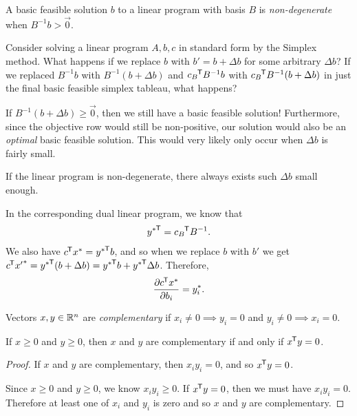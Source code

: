 \begin{defn}
    A basic feasible solution $b$ to a linear program with basis $B$ is \emph{non-degenerate} when $B^{-1}b > \vec{0}$.
\end{defn}

Consider solving a linear program $A, b, c$ in standard form by the Simplex method. What happens if we replace $b$ with $b' = b + \Delta b$ for some arbitrary $\Delta b$? If we replaced $B^{-1}b$ with $B^{-1}(b + \Delta b)$ and ${c_B}^{\mkern-1.5mu\mathsf{T}}B^{-1}b$ with ${c_B}^{\mkern-1.5mu\mathsf{T}}B^{-1}(b + \Delta b)$ in just the final basic feasible simplex tableau, what happens?

If $B^{-1}(b + \Delta b) \geq \vec{0}$, then we still have a basic feasible solution! Furthermore, since the objective row would still be non-positive, our solution would also be an \emph{optimal} basic feasible solution. This would very likely only occur when $\Delta b$ is fairly small.

If the linear program is non-degenerate, there always exists such $\Delta b$ small enough.

In the corresponding dual linear program, we know that
\begin{align*}
    {y^*}^{\mkern-1.5mu\mathsf{T}} = {c_B}^{\mkern-1.5mu\mathsf{T}}B^{-1}.
\end{align*}
We also have ${c}^{\mkern-1.5mu\mathsf{T}}x^* = {y^*}^{\mkern-1.5mu\mathsf{T}}b$, and so when we replace $b$ with $b'$ we get
${c}^{\mkern-1.5mu\mathsf{T}}{x'}^{*} = {y^*}^{\mkern-1.5mu\mathsf{T}}(b + \Delta b) = {y^*}^{\mkern-1.5mu\mathsf{T}}b + {y^*}^{\mkern-1.5mu\mathsf{T}}\Delta b$. Therefore,
\begin{align*}
    \frac{\partial{c}^{\mkern-1.5mu\mathsf{T}}{x}^{*}}{\partial b_i} = y_i^*.
\end{align*}

\begin{defn}
    Vectors $x, y \in \mathbb{R}^n$ are \emph{complementary} if $x_i \neq 0 \implies y_i = 0$ and $y_i \neq 0 \implies x_i = 0$.
\end{defn}

\begin{prop}\label{complementary-orthogonal}
    If $x \geq 0$ and $y \geq 0$, then $x$ and $y$ are complementary if and only if ${x}^{\mkern-1.5mu\mathsf{T}}y = 0$.
\end{prop}

\begin{proof}
    If $x$ and $y$ are complementary, then $x_iy_i = 0$, and so ${x}^{\mkern-1.5mu\mathsf{T}}y = 0$.

    Since $x \geq 0$ and $y \geq 0$, we know $x_iy_i \geq 0$. If ${x}^{\mkern-1.5mu\mathsf{T}}y = 0$, then we must have $x_iy_i = 0$. Therefore at least one of $x_i$ and $y_i$ is zero and so $x$ and $y$ are complementary.
\end{proof}

